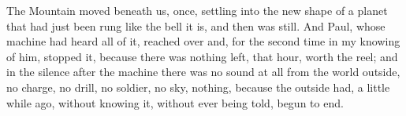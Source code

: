 The Mountain moved beneath us, once, settling into the new shape of a planet that had just been rung like the bell it is, and then was still. And Paul, whose machine had heard all of it, reached over and, for the second time in my knowing of him, stopped it, because there was nothing left, that hour, worth the reel; and in the silence after the machine there was no sound at all from the world outside, no charge, no drill, no soldier, no sky, nothing, because the outside had, a little while ago, without knowing it, without ever being told, begun to end.\par
